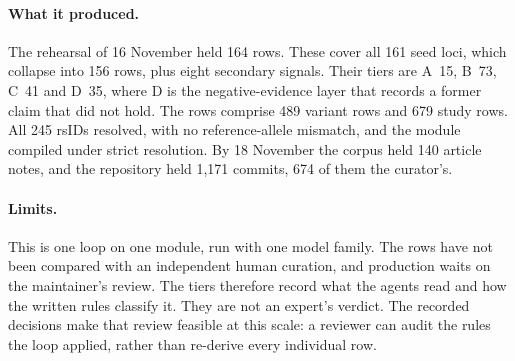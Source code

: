 \paragraph{What it produced.} The rehearsal of 16 November held 164 rows. These
cover all 161 seed loci, which collapse into 156 rows, plus eight secondary
signals. Their tiers are A~15, B~73, C~41 and D~35, where D is the
negative-evidence layer that records a former claim that did not hold. The
rows comprise 489 variant rows and 679 study rows. All 245 rsIDs resolved,
with no reference-allele mismatch, and the module compiled under strict
resolution. By 18 November the corpus held 140 article notes, and the
repository held 1,171 commits, 674 of them the curator's.

\paragraph{Limits.} This is one loop on one module, run with one model family.
The rows have not been compared with an independent human curation, and
production waits on the maintainer's review. The tiers therefore record what
the agents read and how the written rules classify it. They are not an
expert's verdict. The recorded decisions make that review feasible at this
scale: a reviewer can audit the rules the loop applied, rather than re-derive
every individual row.
